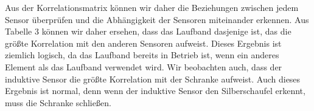 \documentclass[12pt,a4paper]{scrartcl}
\numberwithin{equation}{section}
\begin{document}
 \begin{table}[ht!]
    \caption{Kovarianzmatrix}
    \label{kov}          
\end{table}

Aus der Korrelationsmatrix können wir daher die Beziehungen zwischen jedem Sensor überprüfen und die Abhängigkeit der Sensoren miteinander erkennen. Aus Tabelle 3 können wir daher ersehen, dass das Laufband dasjenige ist, das die größte Korrelation mit den anderen Sensoren aufweist. Dieses Ergebnis ist ziemlich logisch, da das Laufband bereits in Betrieb ist, wenn ein anderes Element als das Laufband verwendet wird. Wir beobachten auch, dass der induktive Sensor die größte Korrelation mit der Schranke aufweist. Auch dieses Ergebnis ist normal, denn wenn der induktive Sensor den Silberschaufel erkennt, muss die Schranke schließen. 
\end{document}
